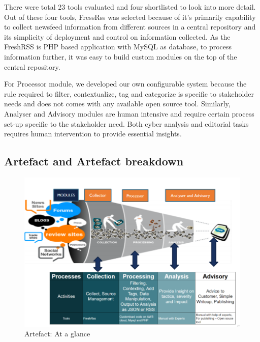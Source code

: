 There were total 23 tools evaluated and four shortlisted to look into more detail. Out of these four tools, FressRss was selected because of it’s primarily capability to collect newsfeed information from different sources in a central repository and its simplicity of deployment and control on information collected. As the FreshRSS is PHP based application with MySQL as database, to process information further, it was easy to build custom modules on the top of the central repository.  

For Processor module, we developed our own configurable system because the rule required to filter, contextualize, tag and categorize is specific to stakeholder needs and does not comes with any available open source tool. Similarly, Analyser and Advisory modules are human intensive and require certain process set-up specific to the stakeholder need. Both cyber analysis and editorial tasks requires human intervention to provide essential insights. 

\subsection{Artefact and Artefact breakdown }\label{Artefact and Artefact breakdown}
\begin{figure}[ht]
    \centering
    \includegraphics[width=1\linewidth,height=0.5\textwidth]{Figures/solution-breakup.PNG}
    \caption{Artefact: At a glance}
    \label{fig:solution-breakup}
\end{figure}

